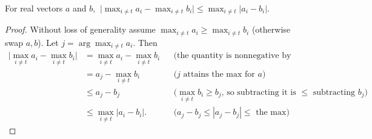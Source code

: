 \begin{lemma}
\label{lem:maxrest}
For real vectors $a$ and $b$, $\ \big|\max_{i\neq t} a_i - \max_{i\neq t} b_i\big| \le \max_{i\neq t}|a_i-b_i|.$
\end{lemma}

\begin{proof}
Without loss of generality assume $\max_{i\neq t} a_i \ge \max_{i\neq t} b_i$ (otherwise swap $a,b$). Let $j=\arg\max_{i\neq t} a_i$. Then
\begin{align*}
  \Big|\max_{i\neq t} a_i - \max_{i\neq t} b_i\Big|
   &= \max_{i\neq t} a_i - \max_{i\neq t} b_i &&\text{(the quantity is nonnegative by assumption)}\\
   &= a_j - \max_{i\neq t} b_i &&\text{(}j\text{ attains the max for }a\text{)}\\
   &\le a_j - b_j &&\text{(}\max_{i\neq t} b_i \ge b_j\text{, so subtracting it is }\le\text{ subtracting }b_j\text{)}\\
   &\le \max_{i\neq t}|a_i-b_i| . &&\text{(}a_j-b_j\le|a_j-b_j|\le\text{ the max)}
\end{align*}
\end{proof}

